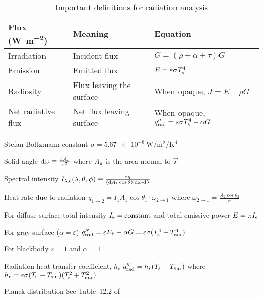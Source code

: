 \documentclass{article}
\begin{document}
\begin{table}[htb]
  \centering
  \caption{Important definitions for radiation analysis}\label{tab:radiation-defs}
  \begin{tabu}{lll}
    \toprule
    Flux (\si{\watt\per\square\meter}) & Meaning & Equation \\
    \midrule
    Irradiation & Incident flux & \(G = (\rho+\alpha+\tau)G\) \\
    Emission & Emitted flux & \(E = \varepsilon\sigma{}T^4_{\mathrm{s}}\) \\
    Radiosity & Flux leaving the surface & When opaque, \(J = E + \rho{}G\)\\
    Net radiative flux & Net flux leaving surface & When opaque,
    \(q''_{\mathrm{rad}} = \varepsilon\sigma{}T^4_{\mathrm{s}}-\alpha{}G\) \\
    \bottomrule
  \end{tabu}
\end{table}

\begin{description*}
  \item[Stefan-Boltzmann constant]
    \(\sigma = \SI{5.67e-8}{\watt\per\square\meter\per\kelvin\tothe{4}}\)
  \item[Solid angle]
    \(\dif{\omega} \equiv \frac{\dif{A_\mrm{n}}}{r^2}\) where
    $A_{\mathrm{n}}$ is the area normal to $\vec{r}$
  \item[Spectral intensity]
    \(I_{\lambda,\mrm{e}}(\lambda,\theta,\phi)
    \equiv \frac{\dif q}{(\dif{A_1}\cos\theta)\cdot\dif{\omega}\cdot\dif{\lambda}}\)
  \item[Heat rate due to radiation]
    \(q_{1\rightarrow2} = I_1A_1\cos\theta_1 \cdot \omega_{2\rightarrow1}\) where
    \(\omega_{2\rightarrow1} = \frac{A_2\cos\theta_2}{r^2}\)
  \item[For diffuse surface]
    total intensity \(I_{\mathrm{e}} = \textrm{constant}\) and
    total emissive power \(E = \pi{}I_{\mathrm{e}}\)
  \item[For gray surface ($\alpha=\varepsilon$)]
    \(q''_{\mathrm{rad}} = \varepsilon E_{\mathrm{b}} - \alpha G
    = \varepsilon\sigma(T_{\mathrm{s}}^4-T_{\mathrm{sur}}^4)\)
  \item[For blackbody] $\varepsilon=1$ and $\alpha=1$
  \item[Radiation heat transfer coefficient, $h_r$]
    \(q''_{\mathrm{rad}} = h_r(T_{\mathrm{s}}-T_{\mathrm{sur}})\) where
    \(h_r = \varepsilon\sigma(T_{\mathrm{s}}+T_{\mathrm{sur}})(T_{\mathrm{s}}^2+T_{\mathrm{sur}}^2)\)
  \item[Planck distribution] See Table~12.2 of~\cite{hamt}
\end{description*}
\end{document}
